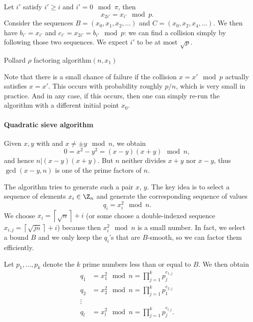 \documentclass[a4paper, 11pt, openany]{book}
\begin{document}
Let $i'$ satisfy $i' \ge i$ and $i' = 0 \mod \pi$, then
\[
    x_{2i'} = x_{i'} \mod p.
\]
Consider the sequences $B = (x_0, x_1, x_2, \dots)$ and $C = (x_0, x_2, x_4, \dots)$. We then have $b_{i'} = x_{i'}$ and $c_{i'} = x_{2i'} = b_{i'} \mod p$: we can find a collision simply by following those two sequences. We expect $i'$ to be at most $\sqrt{p}$.

\begin{algorithm}[H]
\caption{Pollard $\rho$ factoring algorithm$(n,x_1)$}
\begin{algorithmic}[1]
    \EndWhile
    \Else{}
    \EndIf
\end{algorithmic}
\end{algorithm}

Note that there is a small chance of failure if the collision $x = x' \mod p$ actually satisfies $x = x'$. This occurs with probability roughly $p/n$, which is very small in practice. And in any case, if this occurs, then one can simply re-run the algorithm with a different initial point $x_0$.

\paragraph{Quadratic sieve algorithm}

Given $x,y$ with  and $x \ne \pm y \mod n$, we obtain
\[
    0 = x^2 - y^2 = (x-y)(x+y) \mod n,
\]
and hence $n | (x-y)(x+y)$. But $n$ neither divides $x+y$ nor $x-y$, thus $\gcd(x-y,n)$ is one of the prime factors of $n$.

The  algorithm tries to generate such a pair $x$, $y$. The key idea is to select a sequence of elements $x_i \in \Z_n$ and generate the corresponding sequence of values
\[
    q_i = x_i^2 \mod n.
\]
We choose $x_i = \left\lceil \sqrt{n} \right\rceil + i$ (or some choose a double-indexed sequence $x_{i,j} = \left\lceil \sqrt{jn} \right\rceil + i$) because then $x_i^2 \mod n$ is a small number. In fact, we select a bound $B$ and we only keep the $q_i$'s that are $B$-smooth, so we can factor them efficiently.

Let $p_1, \dots, p_k$ denote the $k$ prime numbers less than or equal to $B$. We then obtain
\begin{align*}
    q_1 &= x_1^2 \mod n = \prod_{j=1}^k p_j^{e_{1,j}}\\
    q_2 &= x_2^2 \mod n = \prod_{j=1}^k p_1^{e_{2,j}}\\
    \vdots\\
    q_l &= x_l^2 \mod n = \prod_{j=1}^k p_j^{e_{l,j}}.
\end{align*}
\end{document}
